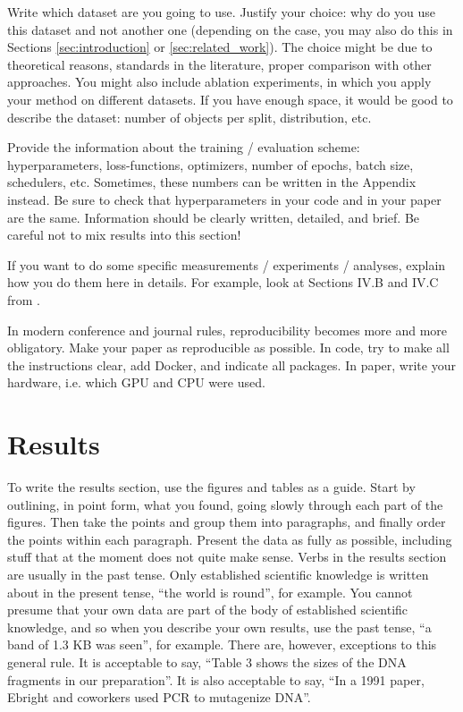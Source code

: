 \documentclass[10pt,conference,compsocconf]{IEEEtran}
\begin{document}
Write which dataset are you going to use. Justify your choice: why do you use this dataset and not another one (depending on the case, you may also do this in Sections \ref{sec:introduction} or \ref{sec:related_work}). The choice might be due to theoretical reasons, standards in the literature, proper comparison with other approaches. You might also include ablation experiments, in which you apply your method on different datasets. If you have enough space, it would be good to describe the dataset: number of objects per split, distribution, etc.

Provide the information about the training / evaluation scheme: hyperparameters, loss-functions, optimizers, number of epochs, batch size, schedulers, etc. Sometimes, these numbers can be written in the Appendix instead. Be sure to check that hyperparameters in your code and in your paper are the same. Information should be clearly written, detailed, and brief. Be careful not to mix results into this section!

If you want to do some specific measurements / experiments / analyses, explain how you do them here in details. For example, look at Sections IV.B and IV.C from \cite{grinberg2023rawspectrogram}.

In modern conference and journal rules, reproducibility becomes more and more obligatory. Make your paper as reproducible as possible. In code, try to make all the instructions clear, add Docker, and indicate all packages. In paper, write your hardware, i.e. which GPU and CPU were used. 

\section{Results}\label{sec:results}
To write the results section, use the figures and tables as a guide. Start by outlining, in point form, what you found, going slowly through each part of the figures. Then take the points and group them into paragraphs, and finally order the points within each paragraph. Present the data as fully as possible, including stuff that at the moment does not quite make sense. Verbs in the results section are usually in the past tense. Only established scientific knowledge is written about in the present tense, “the world is round”, for example. You cannot presume
that your own data are part of the body of established scientific knowledge, and so when you describe your own results, use the past tense, “a band of 1.3 KB was seen”, for example. There are, however, exceptions to this general rule. It is acceptable to say, “Table 3 shows the sizes of the DNA fragments in our preparation”. It is also acceptable to say, “In a 1991 paper, Ebright and coworkers used PCR to mutagenize DNA”.
\end{document}
